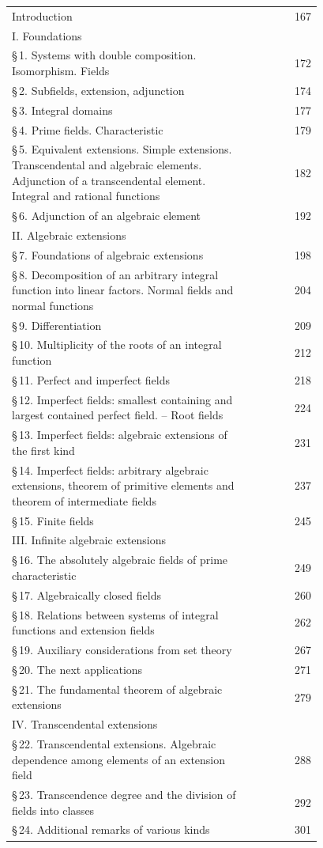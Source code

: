 \begin{tabular}{p{0.78\linewidth}r}
Introduction & 167\\
I. Foundations & \\
\quad \S\,1. Systems with double composition. Isomorphism. Fields & 172\\
\quad \S\,2. Subfields, extension, adjunction & 174\\
\quad \S\,3. Integral domains & 177\\
\quad \S\,4. Prime fields. Characteristic & 179\\
\quad \S\,5. Equivalent extensions. Simple extensions. Transcendental and algebraic elements. Adjunction of a transcendental element. Integral and rational functions & 182\\
\quad \S\,6. Adjunction of an algebraic element & 192\\
II. Algebraic extensions & \\
\quad \S\,7. Foundations of algebraic extensions & 198\\
\quad \S\,8. Decomposition of an arbitrary integral function into linear factors. Normal fields and normal functions & 204\\
\quad \S\,9. Differentiation & 209\\
\quad \S\,10. Multiplicity of the roots of an integral function & 212\\
\quad \S\,11. Perfect and imperfect fields & 218\\
\quad \S\,12. Imperfect fields: smallest containing and largest contained perfect field. -- Root fields & 224\\
\quad \S\,13. Imperfect fields: algebraic extensions of the first kind & 231\\
\quad \S\,14. Imperfect fields: arbitrary algebraic extensions, theorem of primitive elements and theorem of intermediate fields & 237\\
\quad \S\,15. Finite fields & 245\\
III. Infinite algebraic extensions & \\
\quad \S\,16. The absolutely algebraic fields of prime characteristic & 249\\
\quad \S\,17. Algebraically closed fields & 260\\
\quad \S\,18. Relations between systems of integral functions and extension fields & 262\\
\quad \S\,19. Auxiliary considerations from set theory & 267\\
\quad \S\,20. The next applications & 271\\
\quad \S\,21. The fundamental theorem of algebraic extensions & 279\\
IV. Transcendental extensions & \\
\quad \S\,22. Transcendental extensions. Algebraic dependence among elements of an extension field & 288\\
\quad \S\,23. Transcendence degree and the division of fields into classes & 292\\
\quad \S\,24. Additional remarks of various kinds & 301
\end{tabular}
